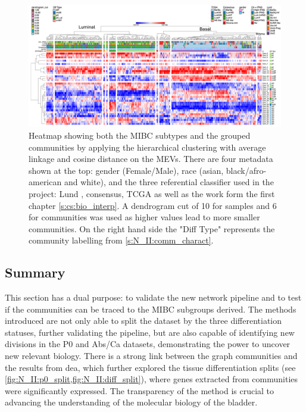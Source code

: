\begin{figure}
    \includegraphics[width=1.0\textwidth,keepaspectratio]{Sections/Network_II/resources/non_tum/iMev_3_3_cs_13_horiz.png}
    
    \caption[Heatmap: MIBC subgroups derived from non-tumour network]{Heatmap showing both the MIBC subtypes and the grouped communities by applying the hierarchical clustering with average linkage and cosine distance on the MEVs. There are four metadata shown at the top: gender (Female/Male), race (asian, black/afro-american and white), and the three referential classifier used in the project: Lund \citet{Marzouka2018-ge}, consensus\citet{Kamoun2020-tj}, TCGA \citet{Robertson2017-mg} as well as the work form the first chapter \cref{s:cs:bio_interp}. A dendrogram cut of 10 for samples and 6 for communities was used as higher values lead to more smaller communities. On the right hand side the "Diff Type" represents the community labelling from \cref{s:N_II:comm_charact}.
    }
    \label{fig:N_II:tum_morph}
\end{figure}


\subsection{Summary}


This section has a dual purpose: to validate the new network pipeline and to test if the communities can be traced to the MIBC subgroups derived. The methods introduced are not only able to split the dataset by the three differentiation statuses, further validating the pipeline, but are also capable of identifying new divisions in the P0 and Abs/Ca datasets, demonstrating the power to uncover new relevant biology. There is a strong link between the graph communities and the results from \acrlong{dea}, which further explored the tissue differentiation splits (see \cref{fig:N_II:p0_split,fig:N_II:diff_split}), where genes extracted from communities were significantly expressed. The transparency of the method is crucial to advancing the understanding of the molecular biology of the bladder.



